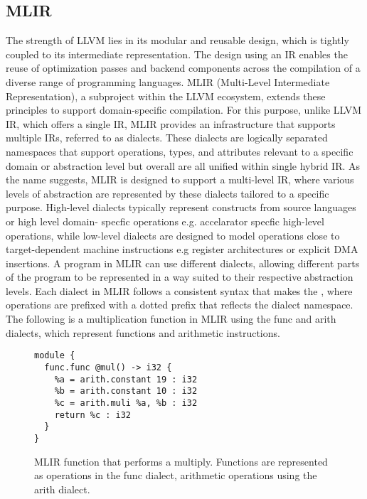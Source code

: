 \subsection{MLIR}
The strength of LLVM lies in its modular and reusable design, which is tightly coupled to its intermediate representation. The design using an IR enables the reuse of optimization passes and backend components across the compilation of a diverse range of programming languages. MLIR (Multi-Level Intermediate Representation), a subproject within the LLVM ecosystem, extends these principles to support domain-specific compilation.
For this purpose, unlike LLVM IR, which offers a single IR, MLIR provides an infrastructure that supports multiple IRs, referred to as dialects. These dialects are logically separated namespaces that support operations, types, and attributes relevant to a specific domain or abstraction level but overall are all unified within single hybrid IR. As the name suggests, MLIR is designed to support a multi-level IR, where various levels of abstraction are represented by these dialects tailored to a specific purpose. High-level dialects typically represent constructs from source languages or high level domain- specfic operations e.g. accelarator specfic high-level operations, while low-level dialects are designed to model operations close to target-dependent machine instructions e.g register architectures or explicit DMA insertions. A program in MLIR can use different dialects, allowing different parts of the program to be represented in a way suited to their respective abstraction levels. Each dialect in MLIR follows a consistent syntax that makes the , where operations are prefixed with a dotted prefix  that reflects the dialect namespace.
The following is a multiplication function in MLIR using the func and arith dialects, which represent functions and arithmetic instructions.
\begin{figure}[ht]
\centering
\begin{lstlisting}[language=mlir, basicstyle=\ttfamily\small]
module {
  func.func @mul() -> i32 {
    %a = arith.constant 19 : i32 
    %b = arith.constant 10 : i32 
    %c = arith.muli %a, %b : i32 
    return %c : i32
  }
}
\end{lstlisting}
\caption{ MLIR function that performs a multiply. Functions are represented as operations in the func dialect, arithmetic operations using the arith dialect.}
\label{fig:mlir-addition}
\end{figure}

